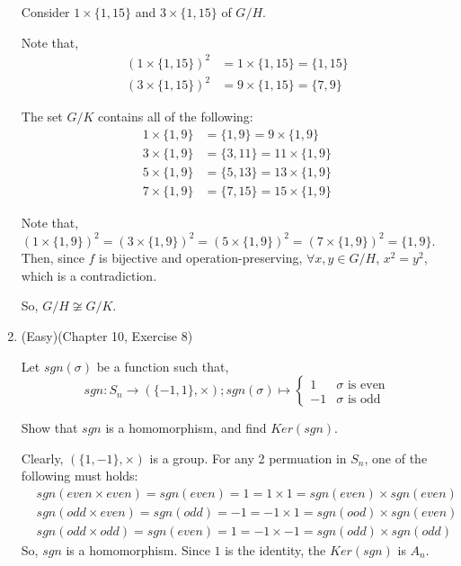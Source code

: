 \documentclass[12pt]{article}
\begin{document}
\begin{enumerate}
        Consider $1 \times \{1,15 \}$ and $3 \times \{1,15\}$ of $G/H$.

        Note that,
        \begin{align*}
            (1\times\{1,15\})^2 &= 1 \times \{1,15\} = \{1,15\}\\
            (3\times\{1,15\})^2 &= 9 \times \{1,15\} = \{7,9\}
        \end{align*}

        The set $G/K$ contains all of the following:
        \begin{align*}
            1 \times \{1,9\} &= \{1,9\} = 9 \times \{1,9\}\\
            3 \times \{1,9\} &= \{3,11\} = 11 \times \{1,9\}\\
            5 \times \{1,9\} &= \{5,13\} = 13 \times \{1,9\}\\
            7 \times \{1,9\} &= \{7,15\} = 15 \times \{1,9\}
        \end{align*}

        Note that, $(1\times \{1,9\})^2 = (3\times \{1,9\})^2 = (5 \times \{1,9\})^2 = (7 \times \{1,9\})^2 = \{1,9\}$. Then, since $f$ is bijective and operation-preserving, $\forall x, y \in G/H$, $x^2 = y^2$, which is a contradiction.

        So, $G/H \not \cong G/K$.
        \pagebreak

    \item (Easy)(Chapter 10, Exercise 8)

        Let $sgn(\sigma)$ be a function such that, $$sgn: S_n \to (\{-1, 1\}, \times); sgn(\sigma) \mapsto \begin{cases} 1 & \sigma \text{ is even} \\ -1 & \sigma \text{ is odd}\end{cases}$$

        Show that $sgn$ is a homomorphism, and find $Ker(sgn)$.

        Clearly, $(\{1,-1\}, \times)$ is a group.
        For any 2 permuation in $S_n$, one of the following must holds:
        \begin{align*}
            &sgn(even \times even) = sgn(even) = 1 = 1 \times 1 = sgn(even) \times sgn(even)\\
            &sgn(odd \times even) = sgn(odd) = -1 = -1 \times 1 = sgn(ood) \times sgn(even)\\
            &sgn(odd \times odd) = sgn(even) = 1 = -1 \times -1 = sgn(odd) \times sgn(odd)
        \end{align*}
        So, $sgn$ is a homomorphism. Since $1$ is the identity, the $Ker(sgn)$ is $A_n$.
        \pagebreak


\end{enumerate}
\end{document}
